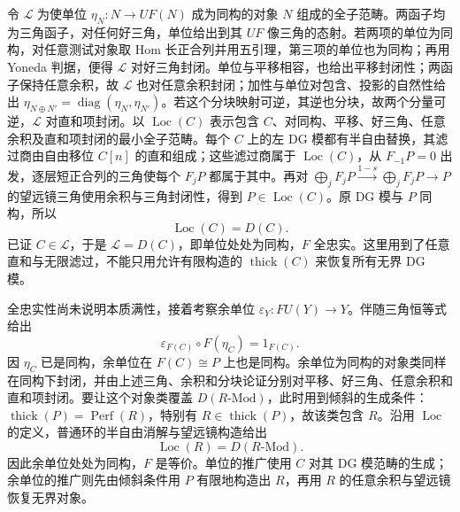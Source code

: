 \begin{proofsketch}
	令 \(\mathcal L\) 为使单位 \(\eta_N:N\to UF(N)\) 成为同构的对象 \(N\) 组成的全子范畴。两函子均为三角函子，对任何好三角，单位给出到其 \(UF\) 像三角的态射。若两项的单位为同构，对任意测试对象取 Hom 长正合列并用五引理，第三项的单位也为同构；再用 Yoneda 判据，便得 \(\mathcal L\) 对好三角封闭。单位与平移相容，也给出平移封闭性；两函子保持任意余积，故 \(\mathcal L\) 也对任意余积封闭；加性与单位对包含、投影的自然性给出 \(\eta_{N\oplus N'}=\operatorname{diag}(\eta_N,\eta_{N'})\)。若这个分块映射可逆，其逆也分块，故两个分量可逆，\(\mathcal L\) 对直和项封闭。以 \(\operatorname{Loc}(C)\) 表示包含 \(C\)、对同构、平移、好三角、任意余积及直和项封闭的最小全子范畴。每个 \(C\) 上的左 DG 模都有半自由替换，其滤过商由自由移位 \(C[n]\) 的直和组成；这些滤过商属于 \(\operatorname{Loc}(C)\)，从 \(F_{-1}P=0\) 出发，逐层短正合列的三角使每个 \(F_jP\) 都属于其中。再对 \(\bigoplus_jF_jP\xrightarrow{1-s}\bigoplus_jF_jP\to P\) 的望远镜三角使用余积与三角封闭性，得到 \(P\in\operatorname{Loc}(C)\)。原 DG 模与 \(P\) 同构，所以
	\[
		\operatorname{Loc}(C)=D(C).
	\]
	已证 \(C\in\mathcal L\)，于是 \(\mathcal L=D(C)\)，即单位处处为同构，\(F\) 全忠实。这里用到了任意直和与无限滤过，不能只用允许有限构造的 \(\operatorname{thick}(C)\) 来恢复所有无界 DG 模。

	全忠实性尚未说明本质满性，接着考察余单位 \(\varepsilon_Y:FU(Y)\to Y\)。伴随三角恒等式给出
	\[
		\varepsilon_{F(C)}\circ F(\eta_C)=1_{F(C)}.
	\]
	因 \(\eta_C\) 已是同构，余单位在 \(F(C)\cong P\) 上也是同构。余单位为同构的对象类同样在同构下封闭，并由上述三角、余积和分块论证分别对平移、好三角、任意余积和直和项封闭。要让这个对象类覆盖 \(D(R\text{-}\mathrm{Mod})\)，此时用到倾斜的生成条件：\(\operatorname{thick}(P)=\operatorname{Perf}(R)\)，特别有 \(R\in\operatorname{thick}(P)\)，故该类包含 \(R\)。沿用 \(\operatorname{Loc}\) 的定义，普通环的半自由消解与望远镜构造给出
	\[
		\operatorname{Loc}(R)=D(R\text{-}\mathrm{Mod}).
	\]
	因此余单位处处为同构，\(F\) 是等价。单位的推广使用 \(C\) 对其 DG 模范畴的生成；余单位的推广则先由倾斜条件用 \(P\) 有限地构造出 \(R\)，再用 \(R\) 的任意余积与望远镜恢复无界对象。


\end{proofsketch}
